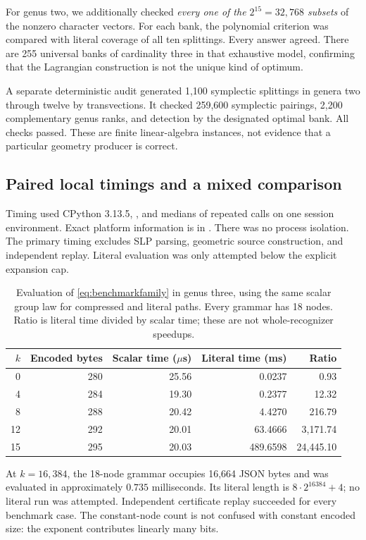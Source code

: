 \documentclass[11pt,letterpaper]{article}
\theoremstyle{definition}
\theoremstyle{remark}
\newcommand{\code}[1]{\texttt{\detokenize{#1}}}
\begin{document}
For genus two, we additionally checked \emph{every one of the $2^{15}=32,768$ subsets} of the nonzero character vectors. For each bank, the polynomial criterion was compared with literal coverage of all ten splittings. Every answer agreed. There are 255 universal banks of cardinality three in that exhaustive model, confirming that the Lagrangian construction is not the unique kind of optimum.

A separate deterministic audit generated 1,100 symplectic splittings in genera two through twelve by transvections. It checked 259,600 symplectic pairings, 2,200 complementary genus ranks, and detection by the designated optimal bank. All checks passed. These are finite linear-algebra instances, not evidence that a particular geometry producer is correct.

\subsection{Paired local timings and a mixed comparison}
Timing used CPython 3.13.5, \code{time.perf_counter}, and medians of repeated calls on one session environment. Exact platform information is in \code{benchmark.json}. There was no process isolation. The primary timing excludes SLP parsing, geometric source construction, and independent replay. Literal evaluation was only attempted below the explicit expansion cap.

\begin{table}[ht]
\centering
\begin{tabular}{@{}rrrrr@{}}
\toprule
$k$ & Encoded bytes & Scalar time ($\mu$s) & Literal time (ms) & Ratio\\
\midrule
0 & 280 & 25.56 & 0.0237 & 0.93\\
4 & 284 & 19.30 & 0.2377 & 12.32\\
8 & 288 & 20.42 & 4.4270 & 216.79\\
12 & 292 & 20.01 & 63.4666 & 3,171.74\\
15 & 295 & 20.03 & 489.6598 & 24,445.10\\
\bottomrule
\end{tabular}
\caption{Evaluation of \eqref{eq:benchmarkfamily} in genus three, using the same scalar group law for compressed and literal paths. Every grammar has 18 nodes. Ratio is literal time divided by scalar time; these are not whole-recognizer speedups.}
\label{tab:timing}
\end{table}

At $k=16,384$, the 18-node grammar occupies 16,664 JSON bytes and was evaluated in approximately $0.735$ milliseconds. Its literal length is $8\cdot2^{16384}+4$; no literal run was attempted. Independent certificate replay succeeded for every benchmark case. The constant-node count is not confused with constant encoded size: the exponent contributes linearly many bits.
\end{document}
